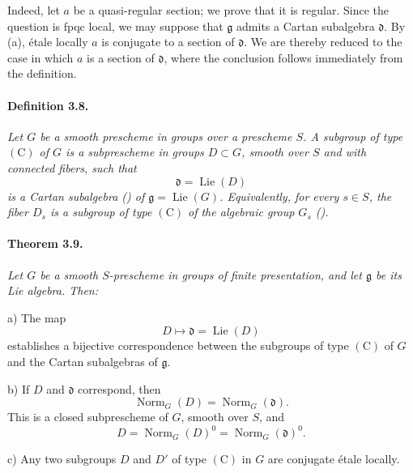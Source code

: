 Indeed, let \(a\) be a quasi-regular section; we prove that it is
regular. Since the question is fpqc local, we may suppose that
\(\mathfrak g\) admits a Cartan subalgebra \(\mathfrak d\). By
\textup{(a)}, étale locally \(a\) is conjugate to a section of
\(\mathfrak d\). We are thereby reduced to the case in which
\(a\) is a section of \(\mathfrak d\), where the conclusion follows
immediately from the definition.

\paragraph{\textbf{Definition 3.8.}}
{\itshape Let \(G\) be a smooth prescheme in groups over a
prescheme \(S\). A \emph{subgroup of type \((\mathrm C)\)} of
\(G\) is a subprescheme in groups \(D\subset G\), smooth over
\(S\) and with connected fibers, such that
\[
  \mathfrak d=\operatorname{Lie}(D)
\]
is a Cartan subalgebra \textup{()} of
\(\mathfrak g=\operatorname{Lie}(G)\). Equivalently, for every
\(s\in S\), the fiber \(D_s\) is a subgroup of type
\((\mathrm C)\) of the algebraic group \(G_s\)
\textup{()}.}



\paragraph{\textbf{Theorem 3.9.}}
{\itshape Let \(G\) be a smooth \(S\)-prescheme in groups of finite
presentation, and let \(\mathfrak g\) be its Lie algebra. Then:

\smallskip
\noindent
\textup{a)}
The map
\[
  D\longmapsto\mathfrak d=\operatorname{Lie}(D)
\]
establishes a bijective correspondence between the subgroups of
type \((\mathrm C)\) of \(G\) and the Cartan subalgebras of
\(\mathfrak g\).

\smallskip
\noindent
\textup{b)}
If \(D\) and \(\mathfrak d\) correspond, then
\[
  \operatorname{Norm}_G(D)=\operatorname{Norm}_G(\mathfrak d).
\]
This is a closed subprescheme of \(G\), smooth over \(S\), and
\[
  D=\operatorname{Norm}_G(D)^0
   =\operatorname{Norm}_G(\mathfrak d)^0.
\]

\smallskip
\noindent
\textup{c)}
Any two subgroups \(D\) and \(D'\) of type \((\mathrm C)\) in
\(G\) are conjugate étale locally.}

